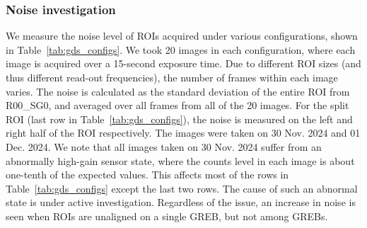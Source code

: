 \subsubsection{Noise investigation}
We measure the noise level of ROIs acquired under various configurations, shown in Table~\ref{tab:gds_configs}. We took 20 images in each configuration, where each image is acquired over a 15-second exposure time. Due to different ROI sizes (and thus different read-out frequencies), the number of frames within each image varies.  The noise is calculated as the standard deviation of the entire ROI from R00\_SG0, and averaged over all frames from all of the 20 images. For the split ROI (last row in Table~\ref{tab:gds_configs}), the noise is measured on the left and right half of the ROI respectively. The images were taken on 30 Nov. 2024 and 01 Dec. 2024. We note that all images taken on 30 Nov. 2024 suffer from an abnormally high-gain sensor state, where the counts level in each image is about one-tenth of the expected values. This affects most of the rows in Table~\ref{tab:gds_configs} except the last two rows. The cause of such an abnormal state is under active investigation. Regardless of the issue, an increase in noise is seen when ROIs are unaligned on a single GREB, but not among GREBs.

